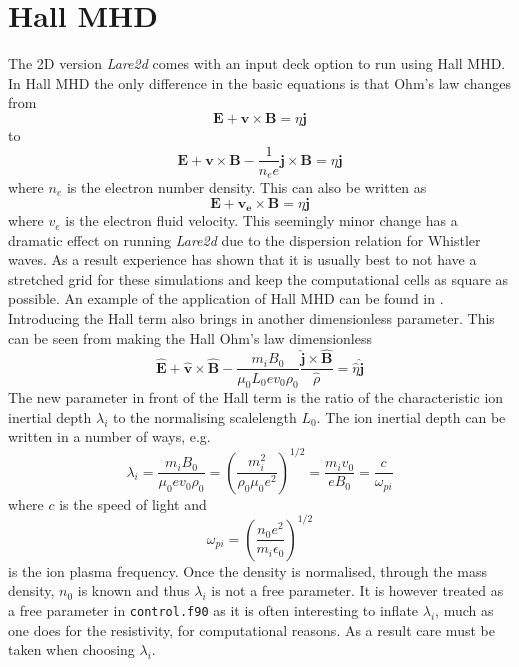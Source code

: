 \documentclass[11pt]{article}
\begin{document}
\section{Hall MHD}
The 2D version {\it Lare2d} comes with an input deck option to run using Hall MHD. In Hall MHD the only difference in the basic equations is that Ohm's law changes from
\begin{displaymath}
\mathbf{E}+\mathbf{v}\times\mathbf{B}=\eta \mathbf{j} 
\end{displaymath}
to
\begin{displaymath}
\mathbf{E}+\mathbf{v}\times\mathbf{B}-\frac{1}{n_e e}\mathbf{j}\times\mathbf{B}=\eta \mathbf{j} 
\end{displaymath}
where $n_e$ is the electron number density. This can also be written as
\begin{displaymath}
\mathbf{E}+\mathbf{v_e}\times\mathbf{B}=\eta \mathbf{j} 
\end{displaymath}
where $v_e$ is the electron fluid velocity. This seemingly minor change has a dramatic effect on running {\it Lare2d} due to the dispersion relation for Whistler waves. As a result experience has shown that it is usually best to not have a stretched grid for these simulations and keep the computational cells as square as possible. An example of the application of Hall MHD can be found in \cite{hall}. Introducing the Hall term also brings in another dimensionless parameter. This can be seen from making the Hall Ohm's law dimensionless
\begin{displaymath}
\hat{\mathbf{E}}+\hat{\mathbf{v}}\times\hat{\mathbf{B}}-\frac{m_iB_0}{\mu_0 L_0 e v_0 \rho_0} \frac{\hat{\mathbf{j}}\times\hat{\mathbf{B}}}{\hat{\rho}}=\hat{\eta} \hat{\mathbf{j}} 
\end{displaymath}
The new parameter in front of the Hall term is the ratio of the characteristic ion inertial depth $\lambda_i$ to the normalising scalelength $L_0$. The ion inertial depth can be written in a number of ways, e.g.
\begin{displaymath}
\lambda_i=\frac{m_i B_0}{\mu_0 e v_0 \rho_0} =\left(\frac{m_i^2}{\rho_0\mu_0e^2}\right)^{1/2}=\frac{m_i v_0}{e B_0}=\frac{c}{\omega_{pi} }
\end{displaymath}
where $c$ is the speed of light and 
\begin{displaymath}
\omega_{pi}=\left(\frac{n_0 e^2}{m_i \epsilon_0}\right)^{1/2}
\end{displaymath}
is the ion plasma frequency. Once the density is normalised, through the mass density, $n_0$ is known and thus $\lambda_i$ is not a free parameter. It is however treated as a free parameter in \texttt{control.f90} as it is often interesting to inflate $\lambda_i$, much as one does for the resistivity, for computational reasons. As a result care must be taken when choosing $\lambda_i$.
\end{document}
